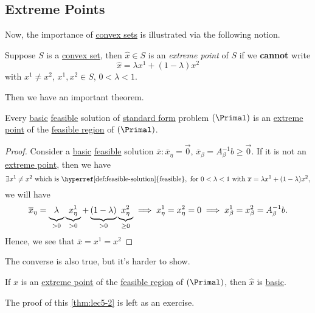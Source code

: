 \subsection{Extreme Points}
Now, the importance of \hyperref[def:convex-set]{convex sets} is illustrated via the following notion.

\begin{definition}\label{def:extreme-point}
	Suppose \(S\) is a \hyperref[def:convex-set]{convex set}, then \(\hat{x} \in S\) is an \emph{extreme point} of \(S\) if we \textbf{cannot} write
	\[
		\hat{x} = \lambda x^1 + (1-\lambda)x^2
	\]
	with \(x^1 \neq x^2\), \(x^1, x^2\in S\), \(0<\lambda<1\).
\end{definition}

Then we have an important theorem.

\begin{theorem}\label{thm:lec5-1}
	Every \hyperref[def:basic-solution]{basic} \hyperref[def:feasible-solution]{feasible} solution of \hyperref[def:standard-form]{standard form} problem \((\Primal)\) is an
	\hyperref[def:extreme-point]{extreme point} of the \hyperref[def:feasible-region]{feasible region} of \((\Primal)\).
\end{theorem}
\begin{proof}
	Consider a \hyperref[def:basic-solution]{basic} \hyperref[def:feasible-solution]{feasible} solution \(\overline{x}\colon \overline{x}_{\eta} = \vec{0}\),
	\(\overline{x}_{\beta} = A^{-1}_{\beta}b\geq \vec{0}\). If it is not an \hyperref[def:extreme-point]{extreme point}, then we have
	\[
		\exists x^1\neq x^2 \text{ which is \hyperref[def:feasible-solution]{feasible}}, \text{ for }0<\lambda<1\text{ with }\overline{x} = \lambda x^1 + (1-\lambda)x^2,
	\]
	we will have
	\[
		\overline{x}_{\eta} = \underbrace{\vphantom{x^1_{\eta}}\lambda}_{>0}\underbrace{x^1_{\eta}}_{>0} + \underbrace{\vphantom{x^1_{\eta}}(1-\lambda)}_{>0}\underbrace{x^2_{\eta}}_{\geq 0} \implies x^1_{\eta} = x^2_{\eta} = 0 \implies x^1_{\beta} = x^2_{\beta} = A^{-1}_{\beta}b.
	\]
	Hence, we see that \(\overline{x} = x^1 = x^2\)\conta
\end{proof}

The converse is also true, but it's harder to show.
\begin{theorem}\label{thm:lec5-2}
	If \(\hat{x}\) is an \hyperref[def:extreme-point]{extreme point} of the \hyperref[def:feasible-region]{feasible region} of \((\Primal)\), then \(\hat{x}\) is
	\hyperref[def:basic-solution]{basic}.
\end{theorem}

The proof of this \autoref{thm:lec5-2} is left as an exercise.